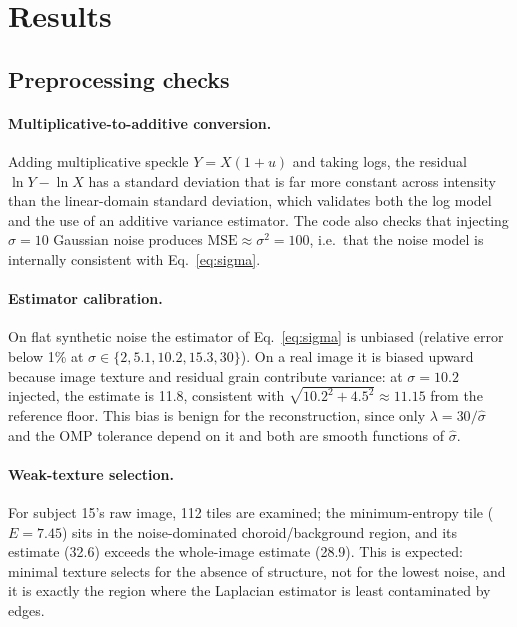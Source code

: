 \documentclass[11pt,a4paper]{article}
\newcommand{\sh}{\hat{\sigma}}
\begin{document}
\section{Results}\label{sec:results}

\subsection{Preprocessing checks}\label{sec:prep}

\paragraph{Multiplicative-to-additive conversion.} Adding multiplicative speckle $Y=X(1+u)$ and taking logs, the
residual $\ln Y-\ln X$ has a standard deviation that is far more constant across intensity than the linear-domain
standard deviation, which validates both the log model and the use of an additive variance estimator. The code
also checks that injecting $\sigma=10$ Gaussian noise produces $\mathrm{MSE}\approx\sigma^2=100$, i.e.\ that the
noise model is internally consistent with Eq.~\eqref{eq:sigma}.

\paragraph{Estimator calibration.} On flat synthetic noise the estimator of Eq.~\eqref{eq:sigma} is unbiased
(relative error below 1\% at $\sigma\in\{2,5.1,10.2,15.3,30\}$). On a real image it is biased upward because image
texture and residual grain contribute variance: at $\sigma=10.2$ injected, the estimate is 11.8, consistent with
$\sqrt{10.2^2+4.5^2}\approx11.15$ from the reference floor. This bias is benign for the reconstruction, since only
$\lambda=30/\sh$ and the OMP tolerance depend on it and both are smooth functions of $\sh$.

\paragraph{Weak-texture selection.} For subject 15's raw image, 112 tiles are examined; the minimum-entropy tile
($E=7.45$) sits in the noise-dominated choroid/background region, and its estimate (32.6) exceeds the whole-image
estimate (28.9). This is expected: minimal texture selects for the absence of structure, not for the lowest noise,
and it is exactly the region where the Laplacian estimator is least contaminated by edges.
\end{document}
